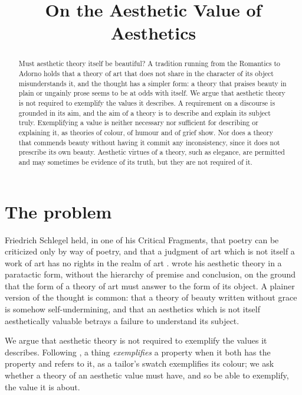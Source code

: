 \documentclass{situationist-preprint}
\title{On the Aesthetic Value of Aesthetics}
\begin{document}
\maketitle

\begin{abstract}
Must aesthetic theory itself be beautiful? A tradition running from the Romantics to Adorno holds that a theory of art that does not share in the character of its object misunderstands it, and the thought has a simpler form: a theory that praises beauty in plain or ungainly prose seems to be at odds with itself. We argue that aesthetic theory is not required to exemplify the values it describes. A requirement on a discourse is grounded in its aim, and the aim of a theory is to describe and explain its subject truly. Exemplifying a value is neither necessary nor sufficient for describing or explaining it, as theories of colour, of humour and of grief show. Nor does a theory that commends beauty without having it commit any inconsistency, since it does not prescribe its own beauty. Aesthetic virtues of a theory, such as elegance, are permitted and may sometimes be evidence of its truth, but they are not required of it.
\end{abstract}

\section{The problem}

Friedrich Schlegel held, in one of his Critical Fragments, that poetry can be criticized only by way of poetry, and that a judgment of art which is not itself a work of art has no rights in the realm of art \citep{Schlegel1971}. \citet{Adorno1997} wrote his aesthetic theory in a paratactic form, without the hierarchy of premise and conclusion, on the ground that the form of a theory of art must answer to the form of its object. A plainer version of the thought is common: that a theory of beauty written without grace is somehow self-undermining, and that an aesthetics which is not itself aesthetically valuable betrays a failure to understand its subject.

We argue that aesthetic theory is not required to exemplify the values it describes. Following \citet{Goodman1968}, a thing \emph{exemplifies} a property when it both has the property and refers to it, as a tailor's swatch exemplifies its colour; we ask whether a theory of an aesthetic value must have, and so be able to exemplify, the value it is about.
\end{document}

